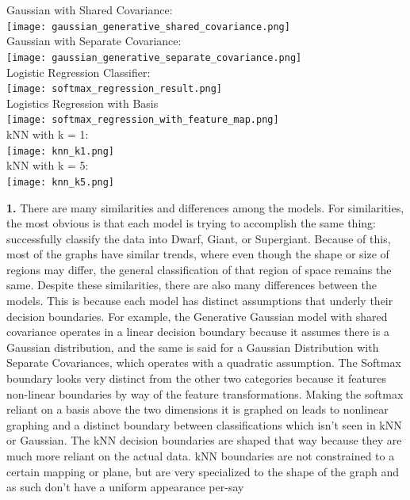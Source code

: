 \documentclass[submit]{harvardml}
\begin{document}
\begin{center}
  Gaussian with Shared Covariance: \\
  \texttt{[image: gaussian\_generative\_shared\_covariance.png]} \\

  Gaussian with Separate Covariance: \\ 
  \texttt{[image: gaussian\_generative\_separate\_covariance.png]} \\

  Logistic Regression Classifier: \\
  \texttt{[image: softmax\_regression\_result.png]} \\

  Logistics Regression with Basis \\
  \texttt{[image: softmax\_regression\_with\_feature\_map.png]} \\

  kNN with k = 1: \\
  \texttt{[image: knn\_k1.png]} \\

  kNN with k = 5: \\
  \texttt{[image: knn\_k5.png]} \\

\end{center}
  \textbf{1.} There are many similarities and differences among the models. For similarities, the most obvious is that 
  each model is trying to accomplish the same thing: successfully classify the data into Dwarf, Giant, or Supergiant. Because of this, 
  most of the graphs have similar trends, where even though the shape or size of regions may differ, the general classification of that region of space remains the same. 
  Despite these similarities, there are also many differences between the models. This is because each model has distinct assumptions that underly their decision boundaries. 
  For example, the Generative Gaussian model with shared covariance operates in a linear decision boundary because it assumes there is a Gaussian distribution, and the same is said for 
  a Gaussian Distribution with Separate Covariances, which operates with a quadratic assumption. The Softmax boundary looks very distinct from the other two categories because it features 
  non-linear boundaries by way of the feature transformations. Making the softmax reliant on a basis above the two dimensions it is graphed on leads to nonlinear graphing and a distinct boundary 
  between classifications which isn't seen in kNN or Gaussian. The kNN decision boundaries are shaped that way because they are much more reliant on the actual data. kNN boundaries are not constrained to a certain mapping or plane, 
  but are very specialized to the shape of the graph and as such don't have a uniform appearance per-say
  
\end{document}
